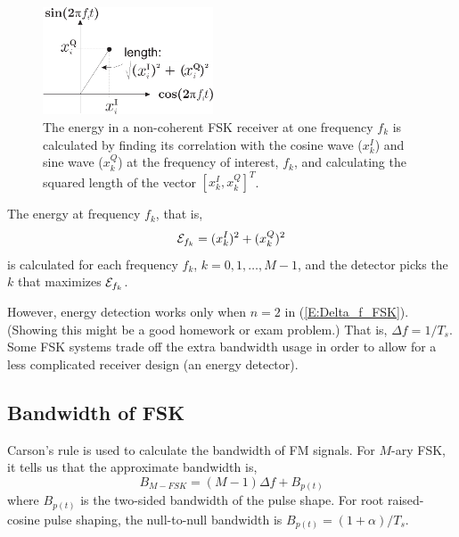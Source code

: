 \begin{figure}[htbp]
  \centerline{\includegraphics[width=0.45\textwidth]{../images/FSK_Energy_Diagram.eps}}
  \caption{The energy in a non-coherent FSK receiver at one frequency $f_k$ is calculated by
  finding its correlation with the cosine wave ($x_{k}^I$) and sine wave ($x_{k}^Q$) at the frequency of interest, $f_{k}$, and
  calculating the squared length of the vector $[x_{k}^I, x_{k}^Q]^T$.}
  \label{F:FSK_Energy_Diagram}
\end{figure}

The energy at frequency $f_{k}$, that is,
\[
 \mathcal{E}_{f_{k}} =  (x_{k}^I)^2 +  (x_{k}^Q)^2
\]
is calculated for each frequency $f_{k}$, $k=0, 1, \ldots, M-1$, and the detector picks the $k$ that maximizes $\mathcal{E}_{f_{k}}$.  

However, energy detection works only when $n=2$ in (\ref{E:Delta_f_FSK}).  (Showing this might be a good homework or exam problem.)  That is, $\Delta f = 1/T_s$.  Some FSK systems trade off the extra bandwidth usage in order to allow for a less complicated receiver design (an energy detector).

\subsection{Bandwidth of FSK}

Carson's rule is used to calculate the bandwidth of FM signals.  For
$M$-ary FSK, it tells us that the approximate bandwidth is,
\[
B_{M-FSK} = (M-1) \Delta f + B_{p(t)}
\]
where $B_{p(t)}$ is the two-sided bandwidth of the pulse shape.
For root raised-cosine pulse shaping, the null-to-null bandwidth is 
$B_{p(t)}=(1+\alpha)/T_s$. 


